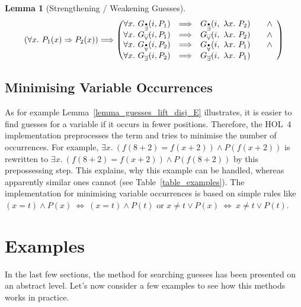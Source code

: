 \documentclass[a4paper,12pt,DIV=12,oneside]{scrbook}
\newtheorem{lemma}{Lemma}[section]
\theoremstyle{definition}
\theoremstyle{remark}
\newcommand{\GEP}{\ensuremath{G_{\accentset{\bullet}{\exists}}}}
\newcommand{\GEG}{\ensuremath{G_{\accentset{\_\,\_}{\exists}}}}
\newcommand{\GUP}{\ensuremath{G_{\accentset{\bullet}{\forall}}}}
\newcommand{\GUG}{\ensuremath{G_{\accentset{\_\,\_}{\forall}}}}
\begin{document}
\begin{lemma}[Strengthening / Weakening Guesses]\label{lemma_guesses_strengthen_weaken}
\[
\left(\forall x.\ P_1(x) \Rightarrow P_2(x)\right) \Longrightarrow
\left(\begin{array}{@{}rcl}
\forall x.\ \GEP(i, P_1) & \Longrightarrow & \GEP(i,\ \lambda x.\ P_2) \qquad \wedge\\
\forall x.\ \GUG(i, P_1) & \Longrightarrow & \GUG(i,\ \lambda x.\ P_2) \qquad \wedge\\
\forall x.\ \GUP(i, P_2) & \Longrightarrow & \GUP(i,\ \lambda x.\ P_1) \qquad \wedge\\
\forall x.\ \GEG(i, P_2) & \Longrightarrow & \GEG(i,\ \lambda x.\ P_1)
\end{array}
\right)
\]
\end{lemma}



\subsection{Minimising Variable Occurrences}\label{subsec_varmin}

As for example Lemma~\ref{lemma_guesses_lift_disj_E} illustrates, it
is easier to find guesses for a variable if it occurs in fewer
positions. Therefore, the HOL~4 implementation preprocesses the term and tries to
minimise the number of occurrences. For example,
$\exists x.\ (f (8 + 2) = f (x + 2)) \wedge P (f (x + 2))$ is
rewritten to $\exists x.\ (f (8 + 2) = f (x + 2)) \wedge P (f (8 +
2))$ by this prepossessing step. This explains, why this example
can be handled, whereas apparently similar ones cannot (see Table~\ref{table_examples}).
The implementation for minimising variable occurrences is based
on simple rules like $(x = t) \wedge P(x)
\ \Longleftrightarrow\ (x = t) \wedge P(t)$ or $x \neq t \vee P(x)
\ \Longleftrightarrow\ x \neq t \vee P(t)$.


\section{Examples}\label{sec_examples}

In the last few sections, the method for searching guesses has been presented on an abstract level.
Let's now consider a few examples to see how this methods works in practice.
\end{document}
